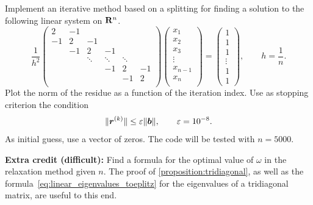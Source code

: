 \begin{compexercise}
    Implement an iterative method based on a splitting for finding a solution to the following linear system on $\mathbf R^n$.
    \[
        \frac{1}{h^2}
        \begin{pmatrix}
            2 & -1 \\
            -1 & 2  & -1 \\
               & -1 & 2      & -1 \\
               &    & \ddots & \ddots & \ddots & \\
               &    &        & -1    & 2      & -1 \\
               &    &        &     & -1      & 2 \\
        \end{pmatrix}
        \begin{pmatrix}
            x_1 \\
            x_2 \\
            x_3 \\
            \vdots \\
            x_{n-1} \\
            x_n \\
        \end{pmatrix}
        =
        \begin{pmatrix}
            1 \\
            1 \\
            1 \\
            \vdots \\
            1 \\
            1
        \end{pmatrix},
        \qquad
        h = \frac{1}{n}.
    \]
    Plot the norm of the residue as a function of the iteration index.
    Use as stopping criterion the condition
    \[
        \lVert\mathbf{\boldsymbol{r}}^{(k)}\rVert \leq \varepsilon \lVert\mathbf{\boldsymbol{b}}\rVert,
        \qquad \varepsilon = 10^{-8}.
    \]
    As initial guess, use a vector of zeros.
    The code will be tested with $n = 5000$.

    \vspace{.2cm}
    \noindent \textbf{Extra credit (difficult):} Find a formula for the optimal value of $\omega$ in the relaxation method given $n$.
    The proof of \cref{proposition:tridiagonal},
    as well as the formula~\eqref{eq:linear_eigenvalues_toeplitz} for the eigenvalues of a tridiagonal matrix,
    are useful to this end.
\end{compexercise}

